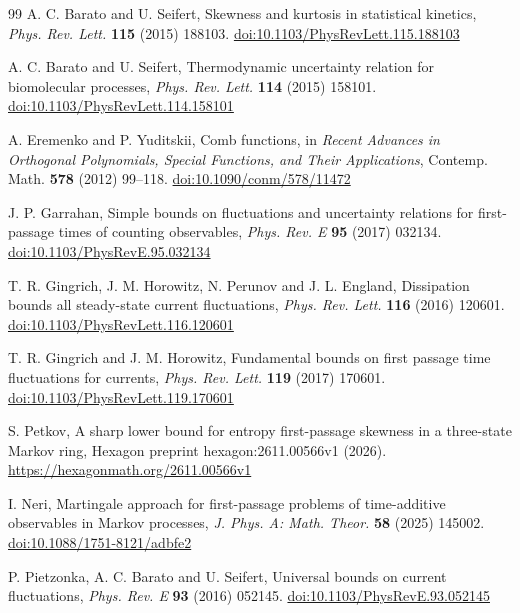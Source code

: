 \documentclass[11pt]{article}
\theoremstyle{remark}
\begin{document}
\begin{thebibliography}{99}\small
{} A. C. Barato and U. Seifert, Skewness and kurtosis in
statistical kinetics, \emph{Phys. Rev. Lett.} \textbf{115} (2015) 188103.
\href{https://doi.org/10.1103/PhysRevLett.115.188103}{doi:10.1103/PhysRevLett.115.188103}

 A. C. Barato and U. Seifert, Thermodynamic uncertainty
relation for biomolecular processes, \emph{Phys. Rev. Lett.} \textbf{114}
(2015) 158101.
\href{https://doi.org/10.1103/PhysRevLett.114.158101}{doi:10.1103/PhysRevLett.114.158101}

 A. Eremenko and P. Yuditskii, Comb functions, in \emph{Recent
Advances in Orthogonal Polynomials, Special Functions, and Their
Applications}, Contemp. Math. \textbf{578} (2012) 99--118.
\href{https://doi.org/10.1090/conm/578/11472}{doi:10.1090/conm/578/11472}

 J. P. Garrahan, Simple bounds on fluctuations and
uncertainty relations for first-passage times of counting observables,
\emph{Phys. Rev. E} \textbf{95} (2017) 032134.
\href{https://doi.org/10.1103/PhysRevE.95.032134}{doi:10.1103/PhysRevE.95.032134}

 T. R. Gingrich, J. M. Horowitz, N. Perunov and J. L.
England, Dissipation bounds all steady-state current fluctuations,
\emph{Phys. Rev. Lett.} \textbf{116} (2016) 120601.
\href{https://doi.org/10.1103/PhysRevLett.116.120601}{doi:10.1103/PhysRevLett.116.120601}

 T. R. Gingrich and J. M. Horowitz, Fundamental bounds on first
passage time fluctuations for currents, \emph{Phys. Rev. Lett.} \textbf{119}
(2017) 170601.
\href{https://doi.org/10.1103/PhysRevLett.119.170601}{doi:10.1103/PhysRevLett.119.170601}

 S. Petkov, A sharp lower bound for entropy first-passage
skewness in a three-state Markov ring, Hexagon preprint
hexagon:2611.00566v1 (2026). \url{https://hexagonmath.org/2611.00566v1}

 I. Neri, Martingale approach for first-passage problems of
time-additive observables in Markov processes, \emph{J. Phys. A: Math.
Theor.} \textbf{58} (2025) 145002.
\href{https://doi.org/10.1088/1751-8121/adbfe2}{doi:10.1088/1751-8121/adbfe2}

 P. Pietzonka, A. C. Barato and U. Seifert, Universal bounds on
current fluctuations, \emph{Phys. Rev. E} \textbf{93} (2016) 052145.
\href{https://doi.org/10.1103/PhysRevE.93.052145}{doi:10.1103/PhysRevE.93.052145}


\end{thebibliography}
\end{document}
